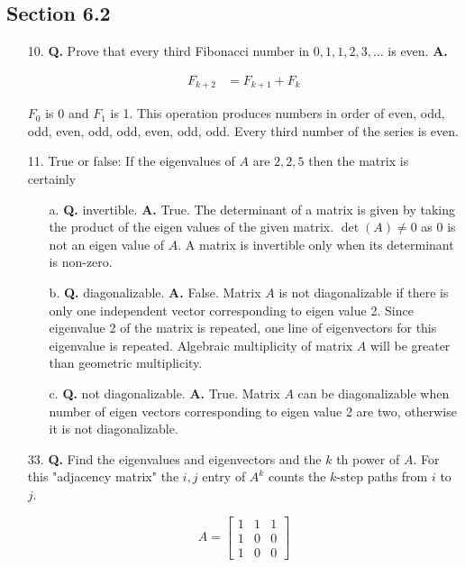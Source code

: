 \documentclass[main.tex]{subfiles}
\begin{document}
\subsection{Section 6.2}
\begin{enumerate}
    \item [10.] \textbf{Q.} Prove that every third Fibonacci number in $0,1,1,2,3, \ldots$ is even. 
    \textbf{A.}

    $$
    \begin{aligned}
    F_{k+2}&=F_{k+1}+F_{k}
    \end{aligned}
    $$

    $F_{0}$ is 0 and $F_{1}$ is 1. This operation produces numbers in order of even, odd, odd, even, odd, odd, even, odd, odd. Every third number of the series is even.
    
    \item [11.] True or false: If the eigenvalues of $A$ are $2,2,5$ then the matrix is certainly
    \begin{enumerate}
        \item [a.] \textbf{Q.} invertible. 
        \textbf{A.} True. The determinant of a matrix is given by taking the product of the eigen values of the given matrix. $\operatorname{det}(A) \neq 0$ as 0 is not an eigen value of $A$. A matrix is invertible only when its determinant is non-zero.
        
        \item [b.] \textbf{Q.} diagonalizable. 
        \textbf{A.} False. Matrix $A$ is not diagonalizable if there is only one independent vector corresponding to eigen value 2. Since eigenvalue 2 of the matrix is repeated, one line of eigenvectors for this eigenvalue is repeated. Algebraic multiplicity of matrix $A$ will be greater than geometric multiplicity.
        
        \item [c.] \textbf{Q.} not diagonalizable. 
        \textbf{A.} True. Matrix $A$ can be diagonalizable when number of eigen vectors corresponding to eigen value 2 are two, otherwise it is not diagonalizable.
        
    \end{enumerate}
    
    \item [33.] \textbf{Q.} Find the eigenvalues and eigenvectors and the $k$ th power of $A$. For this "adjacency matrix" the $i, j$ entry of $A^{k}$ counts the $k$-step paths from $i$ to $j$. 
    
    $$A=\left[\begin{array}{lll}1 & 1 & 1 \\ 1 & 0 & 0 \\ 1 & 0 & 0\end{array}\right]$$


\end{enumerate}
\end{document}
